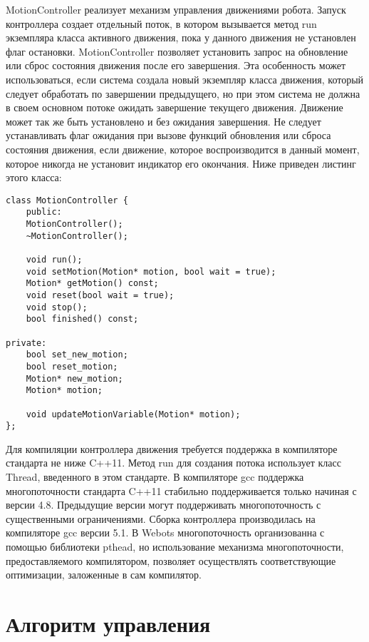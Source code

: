 MotionController реализует механизм управления движениями робота. Запуск контроллера создает отдельный поток, в котором вызывается метод run экземпляра класса активного движения, пока у данного движения не установлен флаг остановки. MotionController позволяет установить запрос на обновление или сброс состояния движения после его завершения. Эта особенность может использоваться, если система создала новый экземпляр класса движения, который следует обработать по завершении предыдущего, но при этом система не должна в своем основном потоке ожидать завершение текущего движения. Движение может так же быть установлено и без ожидания завершения. Не следует устанавливать флаг ожидания при вызове функций обновления или сброса состояния движения, если движение, которое воспроизводится в данный момент, которое никогда не установит индикатор его окончания. Ниже приведен листинг этого класса:


\lstset{language=C++}
\begin{lstlisting}
class MotionController {
    public:
    MotionController();
    ~MotionController();
        
    void run();
    void setMotion(Motion* motion, bool wait = true);
    Motion* getMotion() const;    
    void reset(bool wait = true);
    void stop();
    bool finished() const;
        
private:
    bool set_new_motion;
    bool reset_motion;
    Motion* new_motion;
    Motion* motion;

    void updateMotionVariable(Motion* motion);
};
\end{lstlisting}

Для компиляции контроллера движения требуется поддержка в компиляторе стандарта не ниже C++11. Метод run для создания потока использует класс Thread, введенного в этом стандарте. В компиляторе gcc поддержка многопоточности стандарта C++11 стабильно поддерживается только начиная с версии 4.8. Предыдущие версии могут поддерживать многопоточность с существенными ограничениями. Сборка контроллера производилась на компиляторе gcc версии 5.1. В Webots многопоточность организованна с помощью библиотеки pthead, но использование механизма многопоточности, предоставляемого компилятором, позволяет осуществлять соответствующие оптимизации, заложенные в сам компилятор.

\section{Алгоритм управления}

